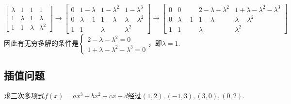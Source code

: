             \begin{solution}
                \[
                    \begin{bmatrix}\lambda&1&1&1\\1&\lambda&1&\lambda\\1&1&\lambda&\lambda^2\end{bmatrix}\rightarrow\begin{bmatrix}0&1-\lambda&1-\lambda^2&1-\lambda^3\\0&\lambda-1&1-\lambda&\lambda-\lambda^2\\1&1&\lambda&\lambda^2\end{bmatrix}\rightarrow\begin{bmatrix}0&0&2-\lambda-\lambda^2&1+\lambda-\lambda^2-\lambda^3\\0&\lambda-1&1-\lambda&\lambda-\lambda^2\\1&1&\lambda&\lambda^2\end{bmatrix}
                \]
                因此有无穷多解的条件是$\begin{cases}2-\lambda-\lambda^2=0\\1+\lambda-\lambda^2-\lambda^3=0\end{cases}$，即$\lambda=1$.
            \end{solution}

        \subsection{插值问题}

            \begin{example}[(Lagrange插值)]
                求三次多项式$f(x)=ax^3+bx^2+cx+d$经过$(1,2),(-1,3),(3,0),(0,2)$.
            \end{example}

